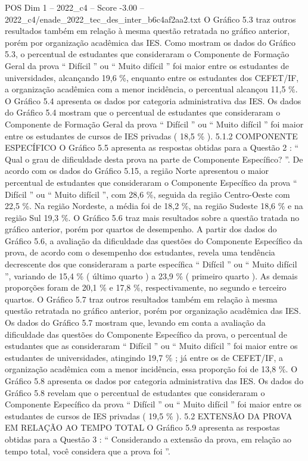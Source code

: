 \begin{textsample}{POS Dim 1 – 2022\_c4 – Score -3.00 – 2022\_c4/enade\_2022\_tec\_des\_inter\_b6c4af2aa2.txt}
O Gráfico 5.3 traz outros resultados também em relação à mesma questão retratada no gráfico anterior, porém por organização acadêmica das IES.
Como mostram os dados do Gráfico 5.3, o percentual de estudantes que consideraram o Componente de Formação Geral da prova “ Difícil ” ou “ Muito difícil ” foi maior entre os estudantes de universidades, alcançando 19,6 \%, enquanto entre os estudantes dos CEFET/IF, a organização acadêmica com a menor incidência, o percentual alcançou 11,5 \%.
O Gráfico 5.4 apresenta os dados por categoria administrativa das IES.
Os dados do Gráfico 5.4 mostram que o percentual de estudantes que consideraram o Componente de Formação Geral da prova “ Difícil ” ou “ Muito difícil ” foi maior entre os estudantes de cursos de IES privadas ( 18,5 \% ). 5.1.2 COMPONENTE ESPECÍFICO O Gráfico 5.5 apresenta as respostas obtidas para a Questão 2 : “ Qual o grau de dificuldade desta prova na parte de Componente Específico? ”.
De acordo com os dados do Gráfico 5.15, a região Norte apresentou o maior percentual de estudantes que consideraram o Componente Específico da prova “ Difícil ” ou “ Muito difícil ”, com 28,6 \%, seguida da região Centro-Oeste com 22,5 \%.
Na região Nordeste, a média foi de 18,2 \%, na região Sudeste 18,6 \% e na região Sul 19,3 \%.
O Gráfico 5.6 traz mais resultados sobre a questão tratada no gráfico anterior, porém por quartos de desempenho.
A partir dos dados do Gráfico 5.6, a avaliação da dificuldade das questões do Componente Específico da prova, de acordo com o desempenho dos estudantes, revela uma tendência decrescente dos que consideraram a parte específica “ Difícil ” ou “ Muito difícil ”, variando de 15,4 \% ( último quarto ) a 23,9 \% ( primeiro quarto ).
As demais proporções foram de 20,1 \% e 17,8 \%, respectivamente, no segundo e terceiro quartos.
O Gráfico 5.7 traz outros resultados também em relação à mesma questão retratada no gráfico anterior, porém por organização acadêmica das IES.
Os dados do Gráfico 5.7 mostram que, levando em conta a avaliação da dificuldade das questões do Componente Específico da prova, o percentual de estudantes que as consideraram “ Difícil ” ou “ Muito difícil ” foi maior entre os estudantes de universidades, atingindo 19,7 \% ; já entre os de CEFET/IF, a organização acadêmica com a menor incidência, essa proporção foi de 13,8 \%.
O Gráfico 5.8 apresenta os dados por categoria administrativa das IES.
Os dados do Gráfico 5.8 revelam que o percentual de estudantes que consideraram o Componente Específico da prova “ Difícil ” ou “ Muito difícil ” foi maior entre os estudantes de cursos de IES privadas ( 19,5 \% ). 5.2 EXTENSÃO DA PROVA EM RELAÇÃO AO TEMPO TOTAL O Gráfico 5.9 apresenta as respostas obtidas para a Questão 3 : “ Considerando a extensão da prova, em relação ao tempo total, você considera que a prova foi ”.

\end{textsample}
